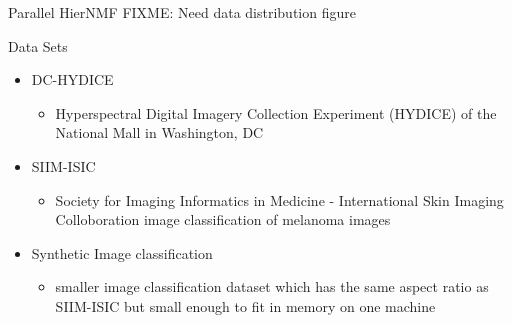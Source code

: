 \documentclass{beamer}
\begin{document}
\begin{frame}{Parallel HierNMF}
    FIXME: Need data distribution figure
\end{frame}

\begin{frame}{Data Sets}
    \begin{itemize}
        \item DC-HYDICE
        \begin{itemize}
            \item Hyperspectral Digital Imagery Collection Experiment (HYDICE) of the National Mall in Washington, DC
        \end{itemize}
        \item SIIM-ISIC
        \begin{itemize}
            \item Society for Imaging Informatics in Medicine - International Skin Imaging Colloboration image classification of melanoma images
        \end{itemize}
        \item Synthetic Image classification
        \begin{itemize}
            \item smaller image classification dataset which has the same aspect ratio as SIIM-ISIC but small enough to fit in memory on one machine
        \end{itemize}
    \end{itemize}
\end{frame}
\end{document}
